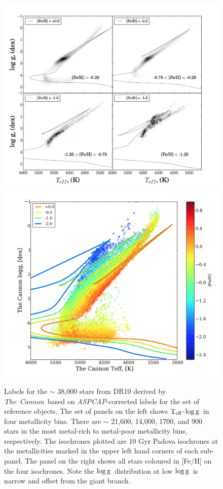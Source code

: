 \documentclass[12pt, preprint]{aastex}
\newcommand{\teff}{\mbox{$\rm T_{eff}$}}
\newcommand{\logg}{\mbox{$\rm \log g$}}
\newcommand{\tc}{\textsl{The~Cannon}}
\newcommand{\aspcap}{\textsl{ASPCAP}}
\begin{document}
\begin{figure}[!h]
\centering
  \includegraphics[scale=0.25]{./plots/iso1.png}
  \hspace{-20pt}
    \includegraphics[scale=0.25]{./plots/iso1a.png}
\caption{Labels for the $\sim$ 38,000 stars from DR10 derived by \tc\ based on \aspcap-corrected labels for the set of reference objects. The set of panels on the left shows \teff-\logg\ in four metallicity bins. There are $\sim$ 21,600, 14,000, 1700, and 900 stars in the most metal-rich to metal-poor metallicity bins, respectively. The isochrones plotted are 10 Gyr Padova isochrones at the metallicities marked in the upper left hand corners of each sub-panel.  The panel on the right shows all stars coloured in [Fe/H] on the four isochrones. Note the \logg\ distribution at low \logg\ is narrow and offset from the giant branch. }
\label{fig:iso}
\end{figure}
\end{document}

